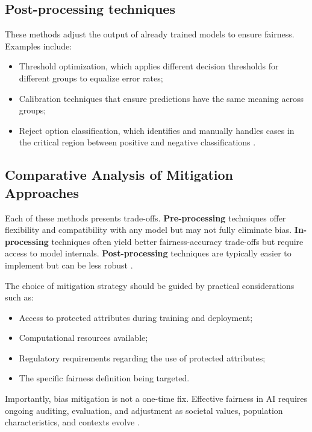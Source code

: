 \documentclass[12pt,a4paper,openright,twoside]{book}
\begin{document}
\subsection{Post-processing techniques} 
These methods adjust the output of already trained models to ensure fairness. Examples include:
\begin{itemize}
    \item Threshold optimization, which applies different decision thresholds for different groups to equalize error rates;
    \item Calibration techniques that ensure predictions have the same meaning across groups;
    \item Reject option classification, which identifies and manually handles cases in the critical region between positive and negative classifications \cite{kamiran2013quantifying}.
\end{itemize}

\subsection{Comparative Analysis of Mitigation Approaches}

Each of these methods presents trade-offs. \textbf{Pre-processing} techniques offer flexibility and compatibility with any model but may not fully eliminate bias. \textbf{In-processing} techniques often yield better fairness-accuracy trade-offs but require access to model internals. \textbf{Post-processing} techniques are typically easier to implement but can be less robust \cite{mehrabi2021survey,suresh2021framework}.

The choice of mitigation strategy should be guided by practical considerations such as:

\begin{itemize}
    \item Access to protected attributes during training and deployment;
    \item Computational resources available;
    \item Regulatory requirements regarding the use of protected attributes;
    \item The specific fairness definition being targeted.
\end{itemize}

Importantly, bias mitigation is not a one-time fix. Effective fairness in AI requires ongoing auditing, evaluation, and adjustment as societal values, population characteristics, and contexts evolve \cite{suresh2021framework}.
\end{document}
